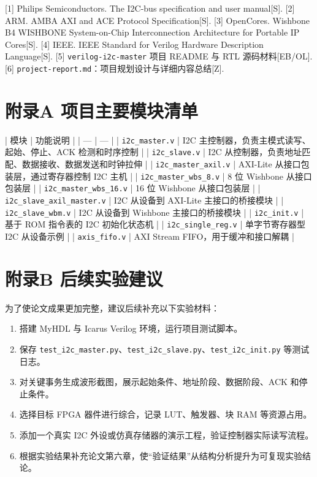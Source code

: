 \documentclass[12pt,a4paper]{article}
\numberwithin{equation}{section}
\begin{document}
[1] Philips Semiconductors. The I2C-bus specification and user manual[S].
[2] ARM. AMBA AXI and ACE Protocol Specification[S].
[3] OpenCores. Wishbone B4 WISHBONE System-on-Chip Interconnection Architecture for Portable IP Cores[S].
[4] IEEE. IEEE Standard for Verilog Hardware Description Language[S].
[5] \texttt{verilog-i2c-master} 项目 README 与 RTL 源码材料[EB/OL].
[6] \texttt{project-report.md}：项目规划设计与详细内容总结[Z].

\clearpage
\section{附录A 项目主要模块清单}

| 模块 | 功能说明 |
| --- | --- |
| \texttt{i2c\_master.v} | I2C 主控制器，负责主模式读写、起始、停止、ACK 检测和时序控制 |
| \texttt{i2c\_slave.v} | I2C 从控制器，负责地址匹配、数据接收、数据发送和时钟拉伸 |
| \texttt{i2c\_master\_axil.v} | AXI-Lite 从接口包装层，通过寄存器控制 I2C 主机 |
| \texttt{i2c\_master\_wbs\_8.v} | 8 位 Wishbone 从接口包装层 |
| \texttt{i2c\_master\_wbs\_16.v} | 16 位 Wishbone 从接口包装层 |
| \texttt{i2c\_slave\_axil\_master.v} | I2C 从设备到 AXI-Lite 主接口的桥接模块 |
| \texttt{i2c\_slave\_wbm.v} | I2C 从设备到 Wishbone 主接口的桥接模块 |
| \texttt{i2c\_init.v} | 基于 ROM 指令表的 I2C 初始化状态机 |
| \texttt{i2c\_single\_reg.v} | 单字节寄存器型 I2C 从设备示例 |
| \texttt{axis\_fifo.v} | AXI Stream FIFO，用于缓冲和接口解耦 |

\clearpage
\section{附录B 后续实验建议}

为了使论文成果更加完整，建议后续补充以下实验材料：

\begin{enumerate}[label=\arabic*.,leftmargin=2em]
    \item 搭建 MyHDL 与 Icarus Verilog 环境，运行项目测试脚本。
    \item 保存 \texttt{test\_i2c\_master.py}、\texttt{test\_i2c\_slave.py}、\texttt{test\_i2c\_init.py} 等测试日志。
    \item 对关键事务生成波形截图，展示起始条件、地址阶段、数据阶段、ACK 和停止条件。
    \item 选择目标 FPGA 器件进行综合，记录 LUT、触发器、块 RAM 等资源占用。
    \item 添加一个真实 I2C 外设或仿真存储器的演示工程，验证控制器实际读写流程。
    \item 根据实验结果补充论文第六章，使“验证结果”从结构分析提升为可复现实验结论。
\end{enumerate}

\clearpage
{}
{}

\nocite{*}

\end{document}
